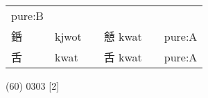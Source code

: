 \documentclass[14pt,a4paper]{scrartcl}
\begin{document}
\begin{longtable}[c]{@{}llllll@{}}
\begin{minipage}[t]{0.14\columnwidth}\raggedright\strut
pure:B
\strut\end{minipage}\tabularnewline
\begin{minipage}[t]{0.14\columnwidth}\raggedright\strut
銽
\strut\end{minipage} &
\begin{minipage}[t]{0.14\columnwidth}\raggedright\strut
kjwot
\strut\end{minipage} &
\begin{minipage}[t]{0.14\columnwidth}\raggedright\strut
\strut\end{minipage} &
\begin{minipage}[t]{0.14\columnwidth}\raggedright\strut
懖 kwat
\strut\end{minipage} &
\begin{minipage}[t]{0.14\columnwidth}\raggedright\strut
\strut\end{minipage} &
\begin{minipage}[t]{0.14\columnwidth}\raggedright\strut
pure:A
\strut\end{minipage}\tabularnewline
\begin{minipage}[t]{0.14\columnwidth}\raggedright\strut
舌
\strut\end{minipage} &
\begin{minipage}[t]{0.14\columnwidth}\raggedright\strut
kwat
\strut\end{minipage} &
\begin{minipage}[t]{0.14\columnwidth}\raggedright\strut
\strut\end{minipage} &
\begin{minipage}[t]{0.14\columnwidth}\raggedright\strut
舌 kwat
\strut\end{minipage} &
\begin{minipage}[t]{0.14\columnwidth}\raggedright\strut
\strut\end{minipage} &
\begin{minipage}[t]{0.14\columnwidth}\raggedright\strut
pure:A
\strut\end{minipage}\tabularnewline
\bottomrule
\end{longtable}

(60) 0303 {[}2{]}
\end{document}
